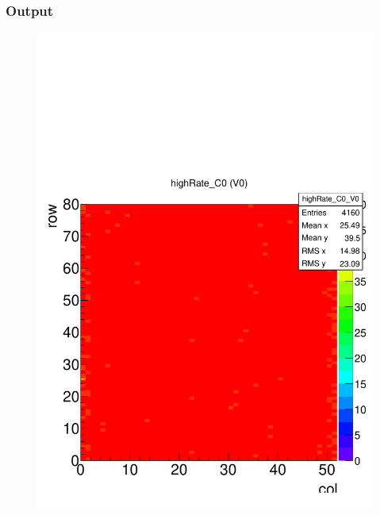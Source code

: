 \documentclass[a4paper,12pt,twoside]{article}
\begin{document}
\subsubsection{Output}
\begin{figure} [h!]
\centering
\begin{minipage}{.48\textwidth}
  \centering
  \includegraphics[width=\textwidth]{./Efficiency_Map.pdf}
  \label{Efficiency-Map}
\end{minipage}%
\hspace{2mm}
\begin{minipage}{.48\textwidth}
  \centering

\end{minipage}
\end{figure}
\end{document}
